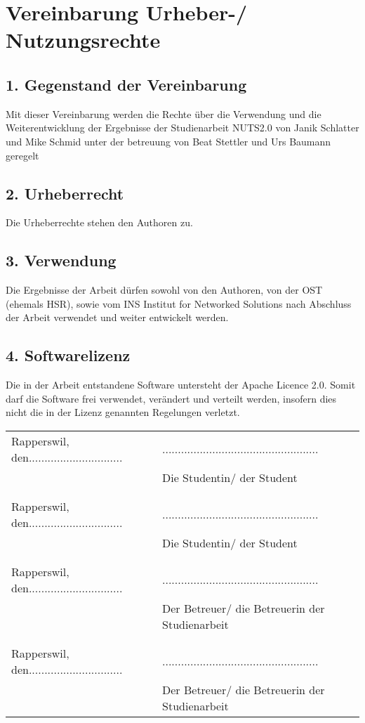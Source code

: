 \documentclass[]{subfiles}
\begin{document}
\section*{Vereinbarung Urheber-/ Nutzungsrechte}
\subsection*{1. Gegenstand der Vereinbarung}
    Mit dieser Vereinbarung werden die Rechte über die Verwendung und die 
    Weiterentwicklung der Ergebnisse der Studienarbeit NUTS2.0 von 
    Janik Schlatter und Mike Schmid unter der betreuung von Beat Stettler und 
    Urs Baumann geregelt

\subsection*{2. Urheberrecht}
    Die Urheberrechte stehen den Authoren zu.

\subsection*{3. Verwendung}
    Die Ergebnisse der Arbeit dürfen sowohl von den Authoren, von der OST (ehemals HSR), 
    sowie vom INS Institut for Networked Solutions nach Abschluss der Arbeit verwendet
    und weiter entwickelt werden.

\subsection*{4. Softwarelizenz}
    Die in der Arbeit entstandene Software untersteht der Apache Licence 2.0.
    Somit darf die Software frei verwendet, verändert und verteilt werden, insofern 
    dies nicht die in der Lizenz genannten Regelungen verletzt.

\begin{tabularx}{\textwidth}{XX}
    Rapperswil, den.............................. & .................................................. \\
    & Die Studentin/ der Student \\
    & \\
    & \\
    Rapperswil, den.............................. & .................................................. \\
    & Die Studentin/ der Student \\
    & \\
    & \\
    Rapperswil, den.............................. & .................................................. \\
    & Der Betreuer/ die Betreuerin der Studienarbeit \\
    & \\
    & \\
    Rapperswil, den.............................. & .................................................. \\
    & Der Betreuer/ die Betreuerin der Studienarbeit \\
\end{tabularx}
\end{document}

